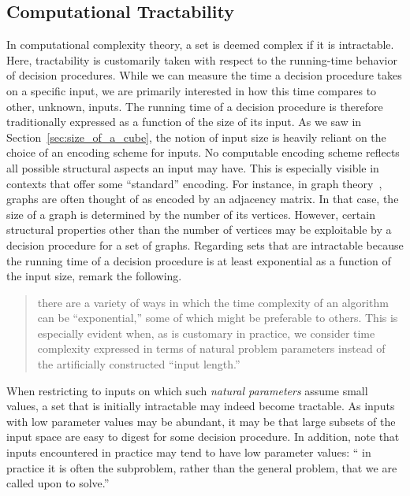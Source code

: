 \subsection{Computational Tractability}
\label{sec:history:tractability}%
In computational complexity theory, a set is deemed complex if it is intractable.
Here, tractability is customarily taken with respect to the running-time behavior of decision procedures.
While we can measure the time a decision procedure takes on a specific input, we are primarily interested in how this time compares to other, unknown, inputs.
The running time of a decision procedure is therefore traditionally expressed as a function of the size of its input.
As we saw in Section~\ref{sec:size_of_a_cube}, the notion of input size is heavily reliant on the choice of an encoding scheme for inputs.
No computable encoding scheme reflects all possible structural aspects an input may have.
This is especially visible in contexts that offer some \enquote{standard} encoding.
For instance, in graph theory~\parencite{diestel2017graph}, graphs are often thought of as encoded by an adjacency matrix.
In that case, the size of a graph is determined by the number of its vertices.
However, certain structural properties other than the number of vertices may be exploitable by a decision procedure for a set of graphs.
Regarding sets that are intractable because the running time of a decision procedure is at least exponential as a function of the input size, \citeauthor{garey1979computers} remark the following.
\blockcquote[Section~4.3]{garey1979computers}{
  \textelp{} there are a variety of ways in which the time complexity of an algorithm can be \enquote{exponential,} some of which might be preferable to others.
  This is especially evident when, as is customary in practice, we consider time complexity expressed in terms of natural problem parameters instead of the artificially constructed \enquote{input length.}
}
When restricting to inputs on which such \emph{natural parameters} assume small values, a set that is initially intractable may indeed become tractable.
As inputs with low parameter values may be abundant, it may be that large subsets of the input space are easy to digest for some decision procedure.
In addition, \citeauthor{garey1979computers} note that inputs encountered in practice may tend to have low parameter values:
\enquote{\textelp{} in practice it is often the subproblem, rather than the general problem, that we are called upon to solve.}

